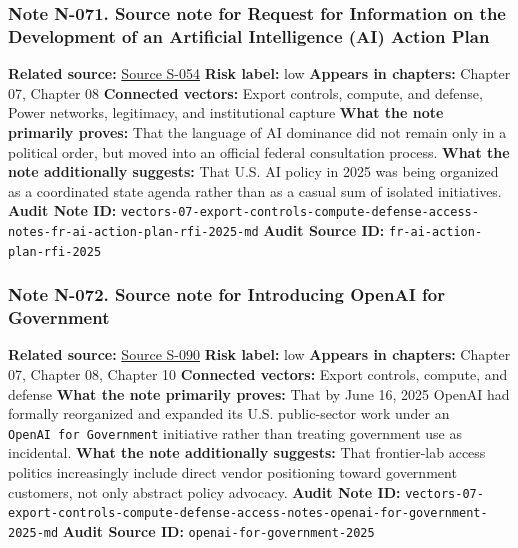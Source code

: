 \documentclass[
  american,
  11pt,
  letterpaper,
]{article}
\begin{document}
\subsubsection{Note N-071. Source note for Request for Information on
the Development of an Artificial Intelligence (AI) Action
Plan}\label{note-n-071-vectors-07-export-controls-compute-defense-access-notes-fr-ai-action-plan-rfi-2025-md}

\textbf{Related source:}
\hyperref[source-s-054-request-for-information-on-the-development-of-an-artificial-intelligence-ai-action-plan]{Source
S-054} \textbf{Risk label:} low \textbf{Appears in chapters:} Chapter
07, Chapter 08 \textbf{Connected vectors:} Export controls, compute, and
defense, Power networks, legitimacy, and institutional capture
\textbf{What the note primarily proves:} That the language of AI
dominance did not remain only in a political order, but moved into an
official federal consultation process. \textbf{What the note
additionally suggests:} That U.S. AI policy in 2025 was being organized
as a coordinated state agenda rather than as a casual sum of isolated
initiatives. \textbf{Audit Note ID:}
\texttt{vectors-07-export-controls-compute-defense-access-notes-fr-ai-action-plan-rfi-2025-md}
\textbf{Audit Source ID:} \texttt{fr-ai-action-plan-rfi-2025}

\subsubsection{Note N-072. Source note for Introducing OpenAI for
Government}\label{note-n-072-vectors-07-export-controls-compute-defense-access-notes-openai-for-government-2025-md}

\textbf{Related source:}
\hyperref[source-s-090-introducing-openai-for-government]{Source S-090}
\textbf{Risk label:} low \textbf{Appears in chapters:} Chapter 07,
Chapter 08, Chapter 10 \textbf{Connected vectors:} Export controls,
compute, and defense \textbf{What the note primarily proves:} That by
June 16, 2025 OpenAI had formally reorganized and expanded its U.S.
public-sector work under an \texttt{OpenAI\ for\ Government} initiative
rather than treating government use as incidental. \textbf{What the note
additionally suggests:} That frontier-lab access politics increasingly
include direct vendor positioning toward government customers, not only
abstract policy advocacy. \textbf{Audit Note ID:}
\texttt{vectors-07-export-controls-compute-defense-access-notes-openai-for-government-2025-md}
\textbf{Audit Source ID:} \texttt{openai-for-government-2025}
\end{document}
